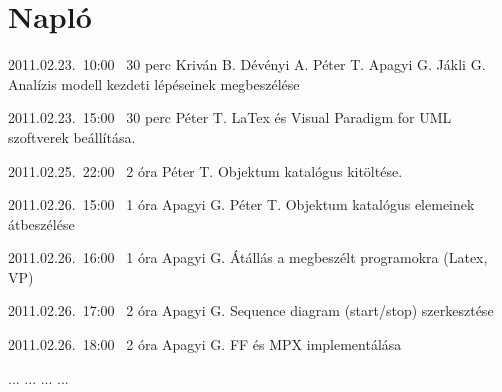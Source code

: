 %
\section{Napló}

\begin{naplo}

\bejegyzes
{2011.02.23.~10:00~} %
{30 perc} %
{Kriván B. \newline
Dévényi A. \newline
Péter T. \newline
Apagyi G. \newline
Jákli G.} %
{Analízis modell kezdeti lépéseinek megbeszélése} %

\bejegyzes
{2011.02.23.~15:00~}
{30 perc}
{Péter T.}
{LaTex és Visual Paradigm for UML szoftverek beállítása.}

\bejegyzes
{2011.02.25.~22:00~} %
{2 óra} %
{Péter T.} %
{Objektum katalógus kitöltése.} %

\bejegyzes
{2011.02.26.~15:00~} %
{1 óra} %
{Apagyi G. \newline
Péter T.} %
{Objektum katalógus elemeinek átbeszélése} %


\bejegyzes
{2011.02.26.~16:00~} %
{1 óra} %
{Apagyi G.} %
{Átállás a megbeszélt programokra (Latex, VP)} %

\bejegyzes
{2011.02.26.~17:00~} %
{2 óra} %
{Apagyi G.} %
{Sequence diagram (start/stop) szerkesztése} %

\bejegyzes
{2011.02.26.~18:00~} %
{2 óra} %
{Apagyi G.} %
{FF és MPX implementálása} %






\bejegyzes
{...}
{...}
{...}
{...}


\end{naplo}


